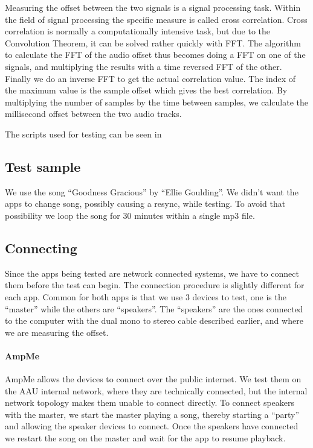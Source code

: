 Measuring the offset between the two signals is a signal processing
task. Within the field of signal processing the specific measure is
called cross correlation. Cross correlation is normally
a computationally intensive task, but due to the Convolution
Theorem\cite{conv_theo}, it can be solved rather quickly with \ac{FFT}.
The algorithm to calculate the \ac{FFT} of the audio offset thus becomes
doing a \ac{FFT} on one of the signals, and multiplying the results with
a time reversed \ac{FFT} of the other. Finally we do an inverse \ac{FFT}
to get the actual correlation value. The index of the maximum value is
the sample offset which gives the best correlation. By multiplying the
number of samples by the time between samples, we calculate the
millisecond offset between the two audio tracks.

The scripts used for testing can be seen in 

\subsection{Test sample}
We use the song ``Goodness Gracious'' by ``Ellie Goulding''.  We didn't
want the apps to change song, possibly causing a resync, while testing.
To avoid that possibility we loop the song for 30 minutes within
a single mp3 file.

\subsection{Connecting}
Since the apps being tested are network connected systems, we have to
connect them before the test can begin. The connection procedure is
slightly different for each app. Common for both apps is that we use
3 devices to test, one is the ``master'' while the others are
``speakers''. The ``speakers'' are the ones connected to the computer
with the dual mono to stereo cable described earlier, and where we are
measuring the offset.

\paragraph{AmpMe}
AmpMe allows the devices to connect over the public internet. We test
them on the AAU internal network, where they are technically connected,
but the internal network topology makes them unable to connect directly.
To connect speakers with the master, we start the master playing a song,
thereby starting a ``party'' and allowing the speaker devices to
connect. Once the speakers have connected we restart the song on the
master and wait for the app to resume playback.

